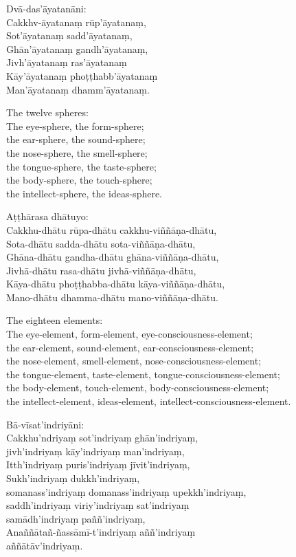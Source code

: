 Dvā-das'āyatanāni:\\
Cakkhv-āyatanaṃ rūp'āyatanaṃ,\\
Sot'āyatanaṃ sadd'āyatanaṃ,\\
Ghān'āyatanaṃ gandh'āyatanaṃ,\\
Jivh'āyatanaṃ ras'āyatanaṃ\\
Kāy'āyatanaṃ phoṭṭhabb'āyatanaṃ\\
Man'āyatanaṃ dhamm'āyatanaṃ.

\begin{english}
  The twelve spheres:\\
  The eye-sphere, the form-sphere;\\
  the ear-sphere, the sound-sphere;\\
  the nose-sphere, the smell-sphere;\\
  the tongue-sphere, the taste-sphere;\\
  the body-sphere, the touch-sphere;\\
  the intellect-sphere, the ideas-sphere.
\end{english}

Aṭṭhārasa dhātuyo:\\
Cakkhu-dhātu rūpa-dhātu cakkhu-viññāṇa-dhātu,\\
Sota-dhātu sadda-dhātu sota-viññāṇa-dhātu,\\
Ghāna-dhātu gandha-dhātu ghāna-viññāṇa-dhātu,\\
Jivhā-dhātu rasa-dhātu jivhā-viññāṇa-dhātu,\\
Kāya-dhātu phoṭṭhabba-dhātu kāya-viññāṇa-dhātu,\\
Mano-dhātu dhamma-dhātu mano-viññāṇa-dhātu.

\begin{english}
  The eighteen elements:\\
  The eye-element, form-element, eye-consciousness-element;\\
  the ear-element, sound-element, ear-consciousness-element;\\
  the nose-element, smell-element, nose-consciousness-element;\\
  the tongue-element, taste-element, tongue-consciousness-element;\\
  the body-element, touch-element, body-consciousness-element;\\
  the intellect-element, ideas-element, intellect-consciousness-element.
\end{english}

Bā-vīsat'indriyāni:\\
Cakkhu'ndriyaṃ sot'indriyaṃ ghān'indriyaṃ,\\
jivh'indriyaṃ kāy'indriyaṃ man'indriyaṃ,\\
Itth'indriyaṃ puris'indriyaṃ jīvit'indriyaṃ,\\
Sukh'indriyaṃ dukkh'indriyaṃ,\\
somanass'indriyaṃ domanass'indriyaṃ upekkh'indriyaṃ,\\
saddh'indriyaṃ viriy'indriyaṃ sat'indriyaṃ\\
samādh'indriyaṃ paññ'indriyaṃ,\\
Anaññātañ-ñassāmī-t'indriyaṃ aññ'indriyaṃ\\
aññātāv'indriyaṃ.


